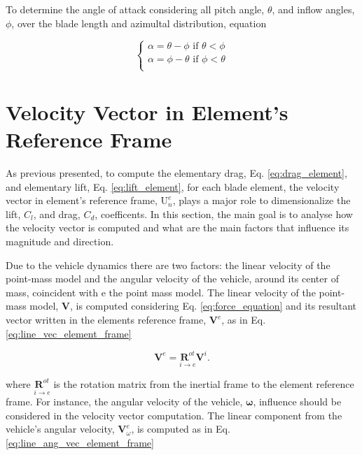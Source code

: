 To determine the angle of attack considering all pitch angle, $\theta$, and inflow angles, $\phi$, over the blade length and azimultal distribution, equation 

\begin{equation}
    \begin{cases}
        \alpha = \theta - \phi \text{ if } \theta < \phi\\
        \alpha = \phi - \theta \text{ if } \phi < \theta\\
    \end{cases}
    \label{eq:angle_of_attack}
\end{equation}

\section{Velocity Vector in Element's Reference Frame}
\label{sec:velocity_element_bet}

As previous presented, to compute the elementary drag, Eq. \ref{eq:drag_element}, and elementary lift, Eq. \ref{eq:lift_element}, for each blade element, the velocity vector in element's reference frame, $\mathrm{U}_n^e$, plays a major role to dimensionalize the lift, $C_l$, and drag, $C_d$, coefficents. In this section, the main goal is to analyse how the velocity vector is computed and what are the main factors that influence its magnitude and direction.

Due to the vehicle dynamics there are two factors: the linear velocity of the point-mass model and the angular velocity of the vehicle,  around its center of mass, coincident with e the point mass model. The linear velocity of the point-mass model, $\mathbf{V}$, is computed considering Eq. \ref{eq:force_equation} and its resultant vector written in the elements reference frame, $\mathbf{V}^e$, as in Eq. \ref{eq:line_vec_element_frame}

\begin{equation}
    \mathbf{V}^e = \underset{i \to e}{\boldsymbol{R}^{ot}} \mathbf{V}^i.
    \label{eq:line_vec_element_frame}
\end{equation}

\noindent where $\underset{i \to e}{\boldsymbol{R}^{ot}}$ is the rotation matrix from the inertial frame to the element reference frame. For instance, the angular velocity of the vehicle, $\boldsymbol{\omega}$, influence should be considered in the velocity vector computation. The linear component from the vehicle’s angular velocity, $\mathbf{V}^e_\omega$, is computed as in Eq. \ref{eq:line_ang_vec_element_frame}

